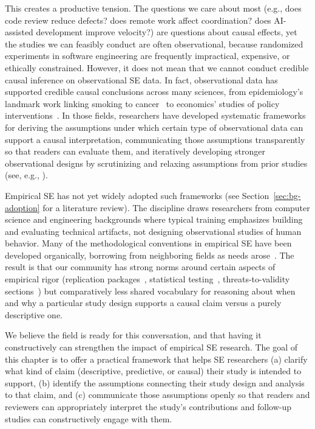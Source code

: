 This creates a productive tension. 
The questions we care about most (e.g., does code review reduce defects? does remote work affect coordination? does AI-assisted development improve velocity?) are questions about causal effects, yet the studies we can feasibly conduct are often observational, because randomized experiments in software engineering are frequently impractical, expensive, or ethically constrained. 
However, it does not mean that we cannot conduct credible causal inference on observational SE data.
In fact, observational data has supported credible causal conclusions across many sciences, from epidemiology's landmark work linking smoking to cancer~\cite{samet2016epidemiology} to economics' studies of policy interventions~\cite{abadie2018econometric}.
In those fields, researchers have developed systematic frameworks for deriving the assumptions under which certain type of observational data can support a causal interpretation, communicating those assumptions transparently so that readers can evaluate them, and iteratively developing stronger observational designs by scrutinizing and relaxing assumptions from prior studies (see, e.g., \citet{angrist2010credibility, pearl2009causality, cunningham2021causal}).

Empirical SE has not yet widely adopted such frameworks (see Section~\ref{sec:bg-adoption} for a literature review). 
The discipline draws researchers from computer science and engineering backgrounds where typical training emphasizes building and evaluating technical artifacts, not designing observational studies of human behavior. 
Many of the methodological conventions in empirical SE have been developed organically, borrowing from neighboring fields as needs arose~\cite{DBLP:journals/jss/TichyLPH95, DBLP:books/sp/08/EasterbrookSSD08}.
The result is that our community has strong norms around certain aspects of empirical rigor (replication packages~\cite{DBLP:journals/corr/abs-2010-03525}, statistical testing~\cite{DBLP:books/sp/WohlinRHORW24}, threats-to-validity sections~\cite{DBLP:journals/tosem/RobillardAEGLNNSSS24}) but comparatively less shared vocabulary for reasoning about when and why a particular study design supports a causal claim versus a purely descriptive one.

We believe the field is ready for this conversation, and that having it constructively can strengthen the impact of empirical SE research. 
The goal of this chapter is to offer a practical framework that helps SE researchers (a) clarify what kind of claim (descriptive, predictive, or causal) their study is intended to support, (b) identify the assumptions connecting their study design and analysis to that claim, and (c) communicate those assumptions openly so that readers and reviewers can appropriately interpret the study's contributions and follow-up studies can constructively engage with them.


